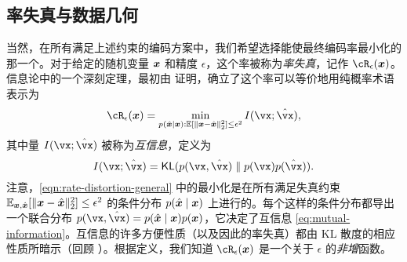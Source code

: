 \documentclass[../../book-main_zh.tex]{subfiles}
\begin{document}
\subsection{率失真与数据几何}
当然，在所有满足上述约束的编码方案中，我们希望选择能使最终编码率最小化的那一个。对于给定的随机变量 $\bm{x}$ 和精度 $\epsilon$，这个率被称为{\em 率失真}，记作 $\cR_{\epsilon}(\x)$。
信息论中的一个深刻定理，最初由 \textcite{shannon1959coding} 证明，确立了这个率可以等价地用纯概率术语表示为
\begin{equation}
	\cR_{\epsilon}(\x) 
	= \min_{p(\hat \x \mid \x): \Ex[\norm{\x -\hat \x}_2^{2}] \le \epsilon^{2}} 
	I(\vx; \hat{\vx}),
    \label{eqn:rate-distortion-general}
\end{equation}
其中量 $I(\vx; \hat{\vx})$ 被称为\textit{互信息}，定义为
\begin{equation}\label{eq:mutual-information}
	I(\vx; \hat{\vx})
	= \KL(p(\vx, \hat{\vx}) \mmid p(\vx) p(\hat{\vx})).
\end{equation}
注意，\eqref{eqn:rate-distortion-general} 中的最小化是在所有满足失真约束 $\Ex_{\x, \hat \x}[\norm{\x- \hat \x}_2^{2}] \le \epsilon^{2}$ 的条件分布 $p(\hat {\bm{x}} \mid \bm{x})$ 上进行的。每个这样的条件分布都导出一个联合分布 $p(\vx,
\hat{\vx}) = p(\hat\x \mid \x) p(\x)$，它决定了互信息 \eqref{eq:mutual-information}。互信息的许多方便性质（以及因此的率失真）都由 KL 散度的相应性质所暗示（回顾 ）。根据定义，我们知道 $\cR_{\epsilon}(\x)$ 是一个关于 $\epsilon$ 的{\em 非增}函数。
\end{document}
